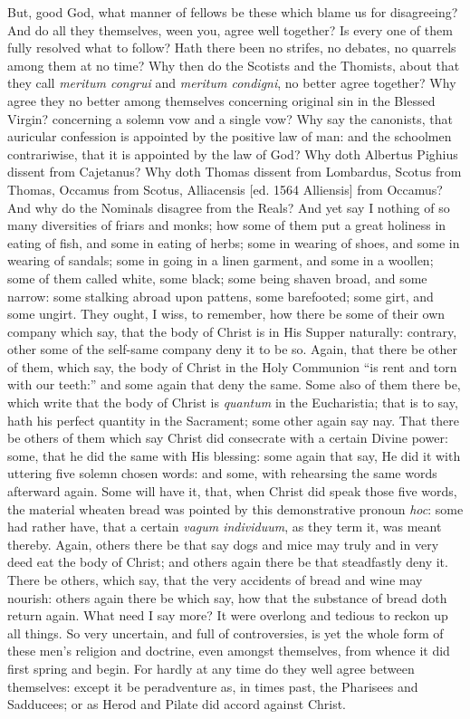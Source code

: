 But, good God, what manner of fellows be these which blame us for
disagreeing? And do all they themselves, ween you, agree well
together? Is every one of them fully resolved what to follow?
Hath there been no strifes, no debates, no quarrels among them at no
time? Why then do the Scotists and the Thomists, about that they
call \emph{meritum congrui} and \emph{meritum condigni}, no better agree
together? Why agree they no better among themselves concerning
original sin in the Blessed Virgin? concerning a solemn vow and a single
vow? Why say the canonists, that auricular confession is appointed
by the positive law of man: and the schoolmen contrariwise, that it
is appointed by the law of God? Why doth Albertus Pighius dissent
from Cajetanus? Why doth Thomas dissent from Lombardus, Scotus
from Thomas, Occamus from Scotus, Alliacensis [ed. 1564 Alliensis] from
Occamus? And why do the Nominals disagree from the Reals?
And yet say I nothing of so many diversities of friars and monks; how
some of them put a great holiness in eating of fish, and some in eating
of herbs; some in wearing of shoes,
and some in wearing of sandals; some in going in a linen garment, and
some in a woollen; some of them called white, some black; some being
shaven broad, and some narrow: some stalking abroad upon pattens, some
barefooted; some girt, and some ungirt. They ought, I wiss, to
remember, how there be some of their own company which say, that the
body of Christ is in His Supper naturally: contrary, other some of the
self-same company deny it to be so. Again, that there be other
of them, which say, the body of Christ in the Holy Communion “is
rent and torn with our teeth:” and some again that deny the same.
Some also of them there be, which write that the body of Christ is \emph{quantum}
in the Eucharistia; that is to say, hath his perfect quantity in the
Sacrament; some other again say nay. That there be others of them
which say Christ did consecrate with a certain Divine power: some, that
he did the same with His blessing: some again that say, He did it with
uttering five solemn chosen words: and some, with rehearsing the same
words afterward again. Some will have it, that, when Christ did
speak those five words, the material wheaten bread was pointed by this
demonstrative pronoun \emph{hoc}: some had rather have, that a certain
\emph{vagum individuum}, as they term it, was meant thereby. Again,
others
there be that say dogs and mice may truly and in very deed eat the body
of Christ; and others again there be that steadfastly deny it.
There be others, which say, that the very accidents of bread and wine
may nourish: others again there be which say, how that the substance
of bread doth return again. What need I say more? It were
overlong and tedious to reckon up all things. So very uncertain,
and full of controversies, is yet the whole form of these men’s
religion and doctrine, even amongst themselves, from whence it did first
spring and begin. For hardly at any time do they well agree between
themselves: except it be peradventure as, in times past, the Pharisees
and Sadducees; or as Herod and Pilate did accord against Christ.

